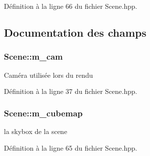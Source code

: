 Définition à la ligne 66 du fichier Scene.\+hpp.



\subsection{Documentation des champs}
\hypertarget{classScene_ac8ac592b03402f99a2890df2603ae459}{
\subsubsection[{m\+\_\+cam}]{\setlength{\rightskip}{0pt plus 5cm}Scene\+::m\+\_\+cam\hspace{0.3cm}{\ttfamily [protected]}}}\label{classScene_ac8ac592b03402f99a2890df2603ae459}
{\ttfamily Caméra} utilisée lors du rendu 

Définition à la ligne 37 du fichier Scene.\+hpp.

\hypertarget{classScene_a8424193126f3a58c21a5fe4281ed9231}{
\subsubsection[{m\+\_\+cubemap}]{\setlength{\rightskip}{0pt plus 5cm}Scene\+::m\+\_\+cubemap\hspace{0.3cm}{\ttfamily [protected]}}}\label{classScene_a8424193126f3a58c21a5fe4281ed9231}
{\ttfamily la} skybox de la scene 

Définition à la ligne 65 du fichier Scene.\+hpp.

